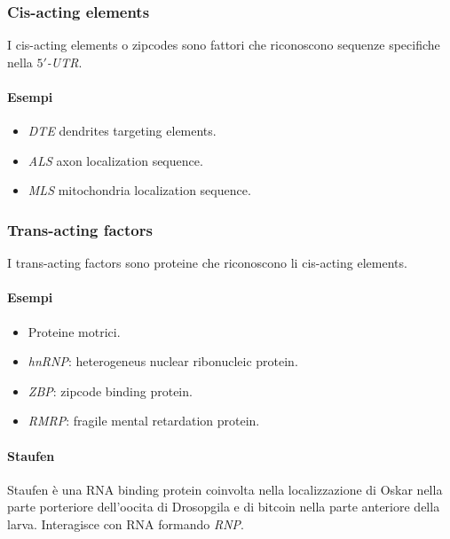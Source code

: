 		\subsubsection{Cis-acting elements}
		I cis-acting elements o zipcodes sono fattori che riconoscono sequenze specifiche nella \emph{$5'$-UTR}.
		
			\paragraph{Esempi}
			\begin{multicols}{2}
				\begin{itemize}
					\item \emph{DTE} dendrites targeting elements.
					\item \emph{ALS} axon localization sequence.
					\item \emph{MLS} mitochondria localization sequence.
				\end{itemize}
			\end{multicols}
	
		\subsubsection{Trans-acting factors}
		I trans-acting factors sono proteine che riconoscono li cis-acting elements.
		
			\paragraph{Esempi}
			\begin{multicols}{2}
				\begin{itemize}
					\item Proteine motrici.
					\item \emph{hnRNP}: heterogeneus nuclear ribonucleic protein.
					\item \emph{ZBP}: zipcode binding protein.
					\item \emph{RMRP}: fragile mental retardation protein.
				\end{itemize}
			\end{multicols}

			\paragraph{Staufen}
			Staufen \`e una RNA binding protein coinvolta nella localizzazione di Oskar nella parte porteriore dell'oocita di Drosopgila e di bitcoin nella parte anteriore della larva.
			Interagisce con RNA formando \emph{RNP}.

